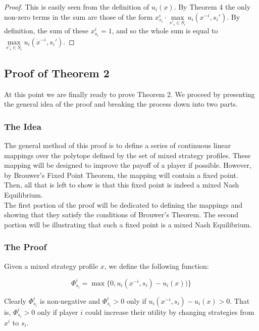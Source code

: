 \documentclass[12pt]{article}
\begin{document}
\begin{proof}
This is easily seen from the definition of $u_i(x)$. By Theorem 4 the only non-zero terms in the sum are those of the form $x^i_{s_i} \cdot \max\limits_{s'_i \in S_i}  u_i(x^{-i}, s_i')$. By definition, the sum of these $x^i_{s_i} = 1$, and so the whole sum is equal to $\max\limits_{s'_i \in S_i}  u_i(x^{-i}, s_i')$.
\end{proof}

\subsection{Proof of Theorem 2}

At this point we are finally ready to prove Theorem 2. We proceed by presenting the general idea of the proof and breaking the process down into two parts.\\

\subsubsection{The Idea}

The general method of this proof is to define a series of continuous linear mappings over the polytope defined by the set of mixed strategy profiles. These mapping will be designed to improve the payoff of a player if possible. However, by Brouwer$'$s Fixed Point Theorem, the mapping will contain a fixed point. Then, all that is left to show is that this fixed point is indeed a mixed Nash Equilibrium.\\

The first portion of the proof will be dedicated to defining the mappings and showing that they satisfy the conditions of Brouwer$'$s Theorem. The second portion will be illustrating that such a fixed point is a mixed Nash Equilibrium.

\subsubsection{The Proof\cite{26}} 

Given a mixed strategy profile $x$, we define the following function:

\begin{equation*}
\Phi^i_{s_i} = \max\{ 0,u_i(x^{-i},s_i) - u_i(x))\}
\end{equation*}

Clearly $\Phi^i_{s_i}$ is non-negative and $\Phi^i_{s_i} > 0$ only if $u_i(x^{-i},s_i) - u_i(x) > 0$. That is, $\Phi^i_{s_i} > 0$ only if player $i$ could increase their utility by changing strategies from $x^i$ to $s_i$.\\
\end{document}
